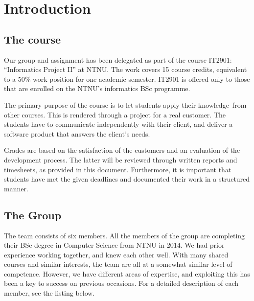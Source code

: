 \chapter{Introduction}
\section{The course}
Our group and assignment has been delegated as part of the course
IT2901: ``Informatics Project II''
at NTNU. The work covers 15 course credits, equivalent to a 50\% work
position for one academic semester. IT2901 is offered only to those
that are enrolled on the NTNU's informatics BSc
programme.

The primary purpose of the course is to let students apply their
knowledge\ from other courses. This is rendered through a project for a
real customer. The students have to communicate independently with
their client, and deliver a software product that answers the
client's needs. 

Grades are based on the satisfaction of the customers and an evaluation
of the development process. The latter will be reviewed through written
reports and timesheets, as provided in this document. Furthermore, it
is important that students have met the given deadlines and documented
their work in a structured manner.

\section{The Group}

The team consists of six members. All the members of the group are
completing their BSc degree in Computer Science from NTNU in 2014. We
had prior experience working together, and knew each other well. With
many shared courses and similar interests, the team are all at a
somewhat similar level of competence. However, we have different areas
of expertise, and exploiting this has been a key to success on previous
occasions. For a detailed description of each member, see the listing
below.

